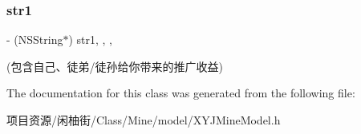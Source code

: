 \subsubsection{\texorpdfstring{str1}{str1}}
{\footnotesize\ttfamily -\/ (N\+S\+String$\ast$) str1\hspace{0.3cm}{\ttfamily [read]}, {\ttfamily [write]}, {\ttfamily [nonatomic]}, {\ttfamily [copy]}}

(包含自己、徒弟/徒孙给你带来的推广收益) 

The documentation for this class was generated from the following file\+:\begin{DoxyCompactItemize}
\item 
项目资源/闲柚街/\+Class/\+Mine/model/X\+Y\+J\+Mine\+Model.\+h\end{DoxyCompactItemize}
